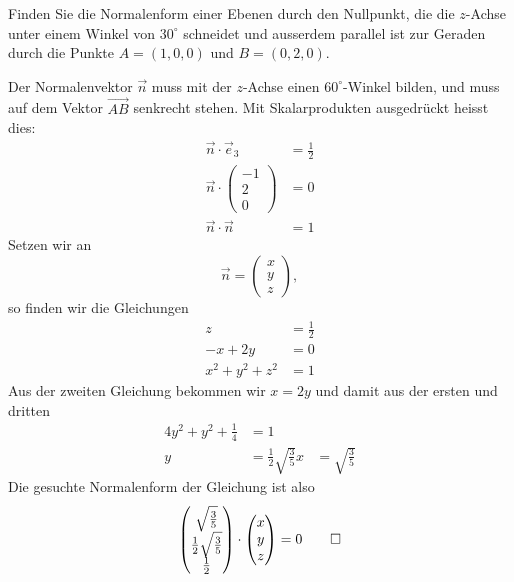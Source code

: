Finden Sie die Normalenform einer Ebenen durch den
Nullpunkt, die die $z$-Achse
unter einem Winkel von $30^\circ$ schneidet und ausserdem
parallel ist zur Geraden durch die Punkte $A=(1,0,0)$ und
$B=(0,2,0)$.


\begin{loesung}
Der Normalenvektor $\vec n$ muss mit der $z$-Achse einen $60^\circ$-Winkel
bilden, und muss auf dem Vektor $\overrightarrow{AB}$ senkrecht stehen.
Mit Skalarprodukten ausgedrückt heisst dies:
\begin{align*}
\vec n\cdot \vec e_3&=\frac12\\
\vec n\cdot \begin{pmatrix}-1\\2\\0\end{pmatrix}&=0\\
\vec n\cdot\vec n&=1
\end{align*}
Setzen wir an
\[
\vec n =
\begin{pmatrix}x\\y\\z\end{pmatrix},
\]
so finden wir die Gleichungen
\begin{align*}
z&= \frac12\\
-x+2y&=0\\
x^2+y^2+z^2&=1
\end{align*}
Aus der zweiten Gleichung bekommen wir $x=2y$ und damit aus der ersten
und dritten
\begin{align*}
4y^2+y^2+\frac14&=1
\\
y&=\frac12\sqrt{\frac35}
x&=\sqrt{\frac35}
\end{align*}
Die gesuchte Normalenform der Gleichung ist also
\[
\begin{pmatrix}
\sqrt{\frac35}\\
\frac12\sqrt{\frac35}\\
\frac12
\end{pmatrix}\cdot \begin{pmatrix}x\\y\\z\end{pmatrix} =0
\qedhere
\]
\end{loesung}

